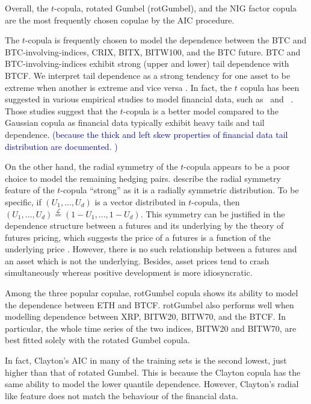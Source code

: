 Overall, the $t$-copula, rotated Gumbel (rotGumbel), and the NIG
factor copula are the most frequently chosen copulae by the AIC
procedure.

The $t$-copula is frequently chosen to model the dependence between
the BTC and BTC-involving-indices, CRIX, BITX, BITW100, and the BTC
future.
BTC and BTC-involving-indices exhibit strong (upper and lower) tail
dependence with BTCF.  We interpret tail dependence as a strong
tendency for one asset to be extreme when another is extreme and
vice versa \citep{McNeil2015}.
In fact, the $t$ copula has been suggested in various empirical
studies to model financial data, such as~\cite{zeevi2002beyond} and~
\cite{breymann2003dependence}.
Those studies suggest that the $t$-copula is a better model compared
to the Gaussian copula as financial data typically exhibit heavy tails
and tail dependence. \textcolor{darkblue}{(because the thick and left
  skew  properties of financial data tail distribution are documented. )}
\medskip

On the other hand, the radial symmetry of the $t$-copula appears to be
a poor choice to model the remaining hedging pairs.
\cite{demarta2005t} describe the radial symmetry feature of the $t$-copula ``strong'' as it is a radially symmetric distribution.
To be specific, if $(U_1, ..., U_d)$ is a vector distributed in $t$-copula,
then $(U_1, ..., U_d) \overset{\mathcal{L}}= (1-U_1, ...,
1-U_d)$.
This symmetry can be justified in the dependence structure between a
futures and its underlying by the theory of futures pricing,
which suggests the price of a futures is a function of the underlying
price \citep{hull2003options}.
However, there is no such relationship between a futures and an asset
which is not the underlying.
Besides, asset prices tend to crash simultaneously whereas positive development is more idiosyncratic. \medskip

Among the three popular copulae, rotGumbel copula shows its ability to model the dependence between ETH and BTCF.
rotGumbel also performs well when modelling dependence between XRP, BITW20, BITW70, and the BTCF.
In particular, the whole time series of the two indices, BITW20 and BITW70, are best fitted solely with the rotated Gumbel copula. \medskip

In fact, Clayton's AIC in many of the training sets is the second lowest, just higher than that of rotated Gumbel.
This is because the Clayton copula has the same ability to model the lower quantile dependence.
However, Clayton's radial like feature does not match the behaviour of
the financial data. \medskip

